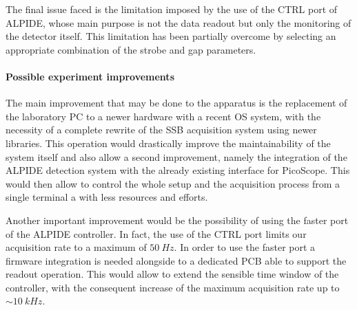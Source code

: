 \documentclass[../../main/main.tex]{subfiles}
\begin{document}
The final issue faced is the limitation imposed by the use of the CTRL port of ALPIDE, whose main purpose is not the data readout but only the monitoring of the detector itself. This limitation has been partially overcome by selecting an appropriate combination of the strobe and gap parameters.


\paragraph{Possible experiment improvements}



The main improvement that may be done to the apparatus is the replacement of the laboratory PC to a newer hardware with a recent OS system, with the necessity of a complete rewrite of the SSB acquisition system using newer libraries.
This operation would drastically improve the maintainability of the system itself and also allow a second improvement, namely the integration of the ALPIDE detection system with the already existing interface for PicoScope. This would then allow to control the whole setup and the acquisition process from a single terminal a with less resources and efforts.
 
Another important improvement would be the possibility of using the faster port of the ALPIDE controller. In fact, the use of the CTRL port limits our acquisition rate to a maximum of \( 50 \ \si{Hz} \). In order to use the faster port a firmware integration is needed alongside to a dedicated PCB able to support the readout operation. This would allow to extend the sensible time window of the controller, with the consequent increase of the maximum acquisition rate up to \( \sim 10 \ \si{kHz} \).
\end{document}
